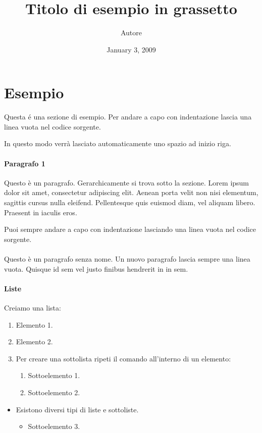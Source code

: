 \documentclass{article}
\title{\textbf{Titolo di esempio in grassetto}}
\author{Autore}
\date{January 3, 2009}
\begin{document}
\maketitle
\section{Esempio} Questa é una sezione di esempio. Per andare a capo con indentazione lascia una linea vuota nel codice sorgente.

In questo modo verrà lasciato automaticamente uno spazio ad inizio riga.   

\paragraph{Paragrafo 1} Questo è un paragrafo. Gerarchicamente si trova sotto la sezione. Lorem ipsum dolor sit amet, consectetur adipiscing elit. Aenean porta velit non nisi elementum, sagittis cursus nulla eleifend. Pellentesque quis euismod diam, vel aliquam libero. Praesent in iaculis eros.

Puoi sempre andare a capo con indentazione lasciando una linea vuota nel codice sorgente.

\paragraph{} Questo è un paragrafo senza nome. Un nuovo paragrafo lascia sempre una linea vuota. Quisque id sem vel justo finibus hendrerit in in sem.
\paragraph{Liste} Creiamo una lista:
\begin{enumerate}
    \item Elemento 1.
    \item Elemento 2.
    \item Per creare una sottolista ripeti il comando all'interno di un elemento:
    \begin{enumerate}
        \item Sottoelemento 1.
        \item Sottoelemento 2.
    \end{enumerate}
\end{enumerate}
\begin{itemize}
    \item Esistono diversi tipi di liste e sottoliste.
    \begin{itemize}
        \item Sottoelemento 3.
    \end{itemize}
\end{itemize}
\end{document}
